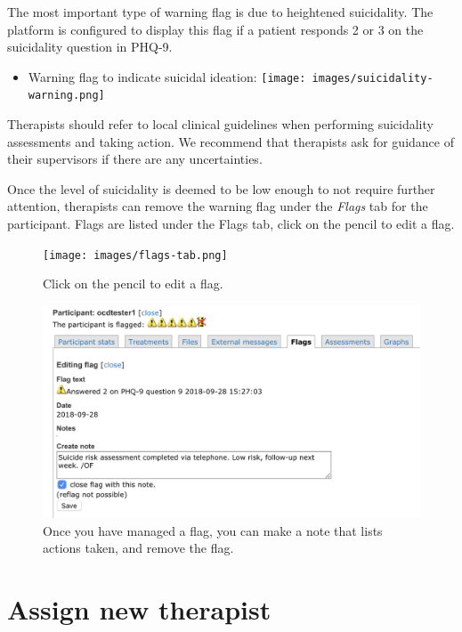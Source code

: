 \documentclass[]{book}
\providecommand{\tightlist}{%
  \setlength{\itemsep}{0pt}\setlength{\parskip}{0pt}}
\begin{document}
The most important type of warning flag is due to heightened suicidality. The platform is configured to display this flag if a patient responds 2 or 3 on the suicidality question in PHQ-9.

\begin{itemize}
\tightlist
\item
  Warning flag to indicate suicidal ideation: \texttt{[image: images/suicidality-warning.png]}
\end{itemize}

Therapists should refer to local clinical guidelines when performing suicidality assessments and taking action. We recommend that therapists ask for guidance of their supervisors if there are any uncertainties.

Once the level of suicidality is deemed to be low enough to not require further attention, therapists can remove the warning flag under the \emph{Flags} tab for the participant. Flags are listed under the Flags tab, click on the pencil to edit a flag.

\begin{figure}
\centering
\texttt{[image: images/flags-tab.png]}
\caption{Click on the pencil to edit a flag.}
\end{figure}

\begin{figure}
\centering
\includegraphics{images/remove-flag.png}
\caption{Once you have managed a flag, you can make a note that lists actions taken, and remove the flag.}
\end{figure}

\hypertarget{assign-new-therapist}{%
\section{Assign new therapist}\label{assign-new-therapist}}
\end{document}
